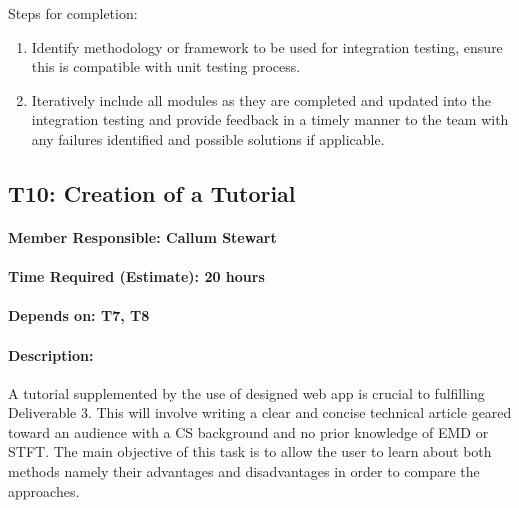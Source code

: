 \documentclass[
  paper=a4,
  ,captions=tableheading
]{scrartcl}
\begin{document}
Steps for completion:
\begin{enumerate}
	\item Identify methodology or framework to be used for integration testing, ensure this is compatible with unit testing process.
	\item Iteratively include all modules as they are completed and updated into the integration testing and provide feedback in a timely manner to the team with any failures identified and possible solutions if applicable.
\end{enumerate}

\newpage
\hypertarget{t10-creation-of-a-tutorial}{%
\subsection{T10: Creation of a
Tutorial}\label{t10-creation-of-a-tutorial}}

\hypertarget{member-responsible-callum-stewart-1}{%
\paragraph{Member Responsible: Callum
Stewart}\label{member-responsible-callum-stewart-1}}

\hypertarget{time-required-estimate-20-hours-4}{%
\paragraph{Time Required (Estimate): 20
hours}\label{time-required-estimate-20-hours-4}}

\hypertarget{depends-on-t7-t8}{%
\paragraph{Depends on: T7, T8}\label{depends-on-t7-t8}}

\hypertarget{description-8}{%
\paragraph{Description:}\label{description-8}}

A tutorial supplemented by the use of designed web app is crucial to
fulfilling Deliverable 3. This will involve writing a clear and concise
technical article geared toward an audience with a CS background and no
prior knowledge of EMD or STFT. The main objective of this task is to
allow the user to learn about both methods namely their advantages and
disadvantages in order to compare the approaches.
\end{document}
